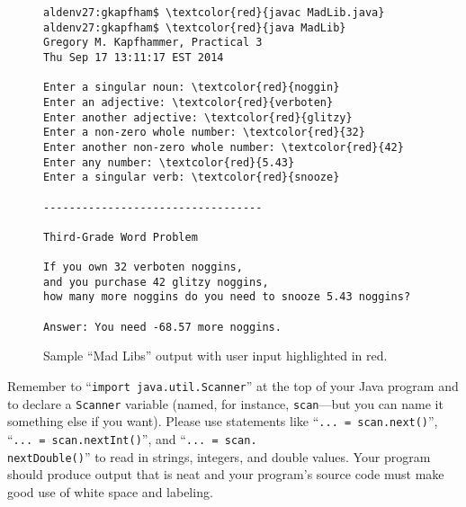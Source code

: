 \begin{figure}[tb]
\begin{Verbatim}[commandchars=\\\{\}]
aldenv27:gkapfham$ \textcolor{red}{javac MadLib.java}
aldenv27:gkapfham$ \textcolor{red}{java MadLib}
Gregory M. Kapfhammer, Practical 3
Thu Sep 17 13:11:17 EST 2014

Enter a singular noun: \textcolor{red}{noggin}
Enter an adjective: \textcolor{red}{verboten}
Enter another adjective: \textcolor{red}{glitzy}
Enter a non-zero whole number: \textcolor{red}{32}
Enter another non-zero whole number: \textcolor{red}{42}
Enter any number: \textcolor{red}{5.43}
Enter a singular verb: \textcolor{red}{snooze}

----------------------------------

Third-Grade Word Problem

If you own 32 verboten noggins,
and you purchase 42 glitzy noggins,
how many more noggins do you need to snooze 5.43 noggins?

Answer: You need -68.57 more noggins.
\end{Verbatim}
\vspace*{-.1in}
\caption{Sample ``Mad Libs'' output with user input highlighted in red.}
\label{mad}
\end{figure}

\noindent Remember to ``{\tt import java.util.Scanner}'' at the top of your Java program and to declare a {\tt Scanner}
variable (named, for instance, {\tt scan}---but you can name it something else if you want). Please use statements like
``{\tt... = scan.next()}'', ``{\tt... = scan.nextInt()}'', and ``{\tt... = scan.\\nextDouble()}'' to read in strings,
integers, and double values. Your program should produce output that is neat and your program's source code must make
good use of white space and labeling.

\vspace*{-.15in}
